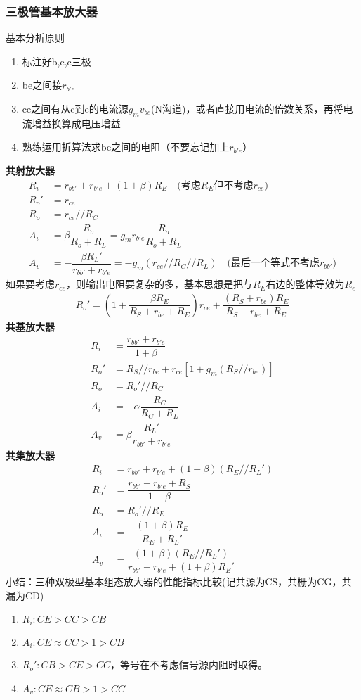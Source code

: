 \documentclass{ctexart}
\newcommand*{\noindbfline}[1]{{\noindent \bf{#1} \newline}}
\begin{document}
\subsubsection{三极管基本放大器}
基本分析原则
\begin{enumerate}
    \item 标注好b,e,c三极
    \item be之间接$r_{b'e}$
    \item ce之间有从c到e的电流源$g_mv_{be}$(N沟道)，或者直接用电流的倍数关系，再将电流增益换算成电压增益
    \item 熟练运用折算法求be之间的电阻（不要忘记加上$r_{b'e}$）
\end{enumerate}
\noindbfline{共射放大器}
\begin{align}
    R_i&=r_{bb'}+r_{b'e}+(1+\beta)R_E \quad \text{(考虑$R_E$但不考虑$r_{ce}$)}\\
    R_o'&=r_{ce}\\
    R_o&=r_{ce}//R_C\\
    A_i&=\beta \dfrac{R_o}{R_o+R_L}=g_mr_{b'e}\dfrac{R_o}{R_o+R_L}\\
    A_v&=-\dfrac{\beta R_L'}{r_{bb'}+r_{b'e}}=-g_m(r_{ce}//R_C//R_L) \quad \text{(最后一个等式不考虑$r_{bb'}$)}
\end{align}
如果要考虑$r_{ce}$，则输出电阻要复杂的多，基本思想是把与$R_E$右边的整体等效为$R_e$
\begin{align}
    R_o'=(1+\dfrac{\beta R_E}{R_S+r_{be}+R_E})r_{ce}+\dfrac{(R_S+r_{be})R_E}{R_S+r_{be}+R_E}
\end{align}
\noindbfline{共基放大器}
\begin{align}
    R_i&=\dfrac{r_{bb'}+r_{b'e}}{1+\beta}\\
    R_o'&=R_S//r_{be}+r_{ce}[1+g_m(R_S//r_{be})]\\
    R_o&=R_o'//R_C\\
    A_i&=-\alpha \dfrac{R_C}{R_C+R_L}\\
    A_v&=\beta \dfrac{R_L'}{r_{bb'}+r_{b'e}}
\end{align}
\noindbfline{共集放大器}
\begin{align}
    R_i&=r_{bb'}+r_{b'e}+(1+\beta)(R_E//R_L')\\
    R_o'&=\dfrac{r_{bb'}+r_{b'e}+R_S}{1+\beta}\\
    R_o&=R_o'//R_E\\
    A_i&=-\dfrac{(1+\beta)R_E}{R_E+R_L'}\\
    A_v&=\dfrac{(1+\beta)(R_E//R_L')}{r_{bb'}+r_{b'e}+(1+\beta)R_E'}
\end{align}
小结：三种双极型基本组态放大器的性能指标比较(记共源为CS，共栅为CG，共漏为CD)
\begin{enumerate}
    \item $R_i:CE>CC>CB$
    \item $A_i:CE\approx CC >1>CB$
    \item $R_o':CB>CE>CC$，等号在不考虑信号源内阻时取得。
    \item $A_v:CE\approx CB >1 >CC$
\end{enumerate}
\end{document}
